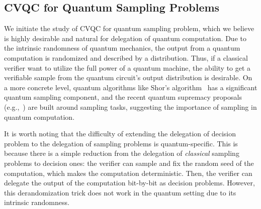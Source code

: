 \subsection{CVQC for Quantum Sampling Problems} \label{subsection:sampling}

We initiate the study of CVQC for quantum sampling problem, which we believe is highly desirable and natural for delegation of quantum computation. Due to the intrinsic randomness of quantum mechanics, the output from a quantum computation is randomized and described by a distribution. 
Thus, if a classical verifier want to utilize the full power of a quantum machine, the ability to get a verifiable sample from the quantum circuit's output distribution is desirable.  On a more concrete level, quantum algorithms like Shor's algorithm~\cite{Shor} has a significant quantum sampling component, and the recent quantum supremacy proposals (e.g.,~\cite{Boson, IQP, nature-google}) are built around sampling tasks, suggesting the importance of sampling in quantum computation.

It is worth noting that the difficulty of extending the delegation of decision problem to the delegation of sampling problems is quantum-specific. This is because 
there is a simple reduction from the delegation of \emph{classical} sampling problems to decision ones:  the verifier can sample and fix the random seed of the computation, 
which makes the computation deterministic. Then, the verifier can delegate the output of the computation bit-by-bit as decision problems. However, this derandomization trick does not work in the quantum setting due to its intrinsic randomness.

\vspace{-3pt}

